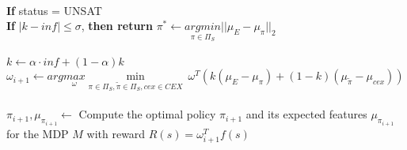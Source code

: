 \begin{algorithm}[htb]
\begin{algorithmic}[1]
\\\qquad\qquad \textbf{If} status = UNSAT
\\\qquad\qquad\qquad \textbf{If} $|k - inf|\leq\sigma$, {\bf then return} $\pi^*\leftarrow\underset{{\pi}\in \Pi_S}{argmin}||\mu_E - \mu_{{\pi}}||_2$\\
\\\qquad\qquad\qquad $k \leftarrow \alpha\cdot inf + (1 - \alpha)k$ 
\\\qquad\qquad $\omega_{i+1} \leftarrow arg\underset{\omega}{max}\underset{\pi\in\Pi_S, \tilde{\pi}\in\Pi_S, cex\in CEX}{\min}\ \omega^T(k(\mu_E - \mu_{\pi})+(1-k)(\mu_{\tilde{\pi}}  - \mu_{cex}))$
\\ 
\\\qquad\qquad $\pi_{i+1}, \mu_{\pi_{i+1}}\gets$ Compute the optimal policy $\pi_{i+1}$ and its expected features $\mu_{\pi_{i+1}}$ for the MDP $M$ with reward $R(s)=\omega_{i+1}^T f(s)$
\\
\end{algorithmic}
\label{algo1}
\end{algorithm}

